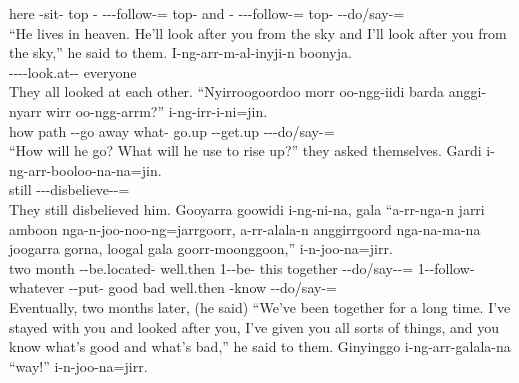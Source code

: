 \begin{exye}
here -sit- top - ---follow-= top- and - ---follow-= top- --do/say-=\\
\ft ``He lives in heaven. He'll look after you from the sky and I'll look after you from the sky,'' he said to them.
\exy {}
\gll I-ng-arr-m-al-inyji-n boonyja.\\
----look.at-- everyone\\
\ft They all looked at each other.
\exy {}
\gll ``Nyirroogoordoo morr oo-ngg-iidi barda anggi-nyarr wirr oo-ngg-arrm?'' i-ng-irr-i-ni=jin.\\
how path --go away what- go.up --get.up ---do/say-=\\
\ft ``How will he go? What will he use to rise up?'' they asked themselves.
\exy {}
\gll Gardi i-ng-arr-booloo-na-na=jin.\\
still ---disbelieve--=\\
\ft They still disbelieved him.
\exy {}
\gll Gooyarra goowidi i-ng-ni-na, gala ``a-rr-nga-n jarri amboon nga-n-joo-noo-ng=jarrgoorr, a-rr-alala-n anggirrgoord nga-na-ma-na joogarra gorna, loogal gala goorr-moonggoon,'' i-n-joo-na=jirr.\\
two month --be.located- well.then 1--be- this together --do/say--= 1--follow- whatever --put-  good bad well.then -know --do/say-=\\
\ft Eventually, two months later, (he said) ``We've been together for a long time. I've stayed with you and looked after you, I've given you all sorts of things, and you know what's good and what's bad,'' he said to them.
\exy {}
\gll Ginyinggo i-ng-arr-galala-na ``way!'' i-n-joo-na=jirr.\\

\end{exye}
